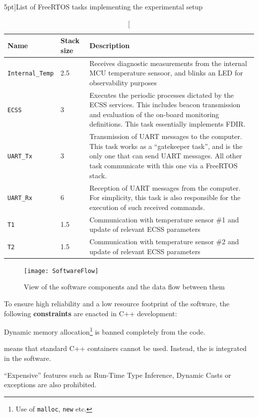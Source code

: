 \documentclass[a4paper,nobib]{tufte-book}
\begin{document}
\begin{table}[h]
	\centering
	\caption[][5pt]{List of Free\acs{RTOS} tasks implementing the experimental setup}
	\label{tab:rtos-tasks}
	\renewcommand{\arraystretch}{1.5}
	\begin{tabularx}{\textwidth}{@{}llX@{}}
		\toprule
		Name & Stack size & Description \\ \midrule
		\texttt{Internal\_Temp} & \SI{2.5}{\kilo\byte} & Receives diagnostic measurements from the internal \acs{MCU} temperature sensoor, and blinks an \acs{LED} for observability purposes \\
		\texttt{ECSS} & \SI{3}{\kilo\byte} & Executes the periodic processes dictated by the \acs{ECSS} services. This includes beacon transmission and evaluation of the on-board monitoring definitions. This task essentially implements \acs{FDIR}. \\
		\texttt{\acs{UART}\_Tx} & \SI{3}{\kilo\byte} & Transmission of \acs{UART} messages to the computer. This task works as a ``gatekeeper task'', and is the only one that can send \acs{UART} messages. All other task communicate with this one via a Free\acs{RTOS} stack. \\
		\texttt{\acs{UART}\_Rx} & \SI{6}{\kilo\byte} & Reception of \acs{UART} messages from the computer. For simplicity, this task is also responsible for the execution of such received commands. \\
		\texttt{T1} & \SI{1.5}{\kilo\byte} & Communication with temperature sensor \#1 and update of relevant \acs{ECSS} parameters \\
		\texttt{T2} & \SI{1.5}{\kilo\byte} & Communication with temperature sensor \#2 and update of relevant \acs{ECSS} parameters \\ \bottomrule
	\end{tabularx}
\end{table}

\begin{figure}[h]
	\texttt{[image: SoftwareFlow]}
	\caption{View of the software components and the data flow between them}
	\label{sec:softwareflow}
\end{figure}

To ensure high reliability and a low resource footprint of the software, the following \textbf{constraints} are enacted in C++ development:
\begin{compactenum}
	\item Dynamic memory allocation\footnote{Use of \texttt{malloc}, \texttt{new} etc.} is banned completely from the code.
	\label{itm:malloc}
	\item {} means that standard C++ containers cannot be used. Instead, the  is integrated in the software.
	\item ``Expensive'' features such as Run-Time Type Inference, Dynamic Casts or exceptions are also prohibited.
\end{compactenum}
\end{document}
